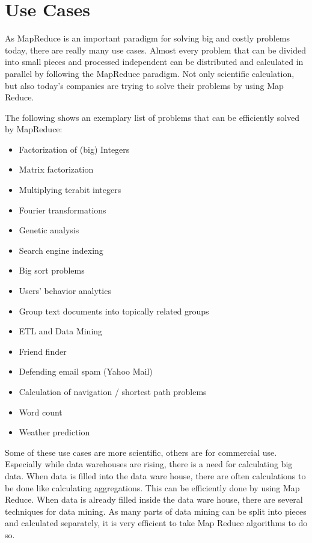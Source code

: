 \chapter{Use Cases}
As MapReduce is an important paradigm for solving big and costly problems today, there are really
many use cases. Almost every problem that can be divided into small pieces and processed independent
can be distributed and calculated in parallel by following the MapReduce paradigm. Not only
scientific calculation, but also today’s companies are trying to solve their problems by using Map
Reduce.

The following shows an exemplary list of problems that can be efficiently solved by MapReduce:
\begin{singlespacing}
	\begin{itemize}
	  \item Factorization of (big) Integers \cite{IntegerFactorization} 
	  \item Matrix factorization \cite{MatrixFactorization} 
	  \item Multiplying terabit integers \cite{TerabitIntegers}
	  \item Fourier transformations
	  \item Genetic analysis \cite{GenomeAnalysis} 
	  \item Search engine indexing
	  \item Big sort problems \cite{OverviewMRAlgorithms} 
	  \item Users' behavior analytics
	  \item Group text documents into topically related groups
	  \item ETL and Data Mining
	  \item Friend finder
	  \item Defending email spam (Yahoo Mail) \cite{DefendingMailSpam} 
	  \item Calculation of navigation / shortest path problems \cite{OverviewMRAlgorithms}
	  \item Word count \cite{OverviewMRAlgorithms} 
	  \item Weather prediction 
	\end{itemize}
\end{singlespacing}
 
Some of these use cases are more scientific, others are for commercial use. Especially while data
warehouses are rising, there is a need for calculating big data. When data is filled into the data
ware house, there are often calculations to be done like calculating aggregations. This can be
efficiently done by using Map Reduce. When data is already filled inside the data ware house, there
are several techniques for data mining. As many parts of data mining can be split into pieces and
calculated separately, it is very efficient to take Map Reduce algorithms to do so.

